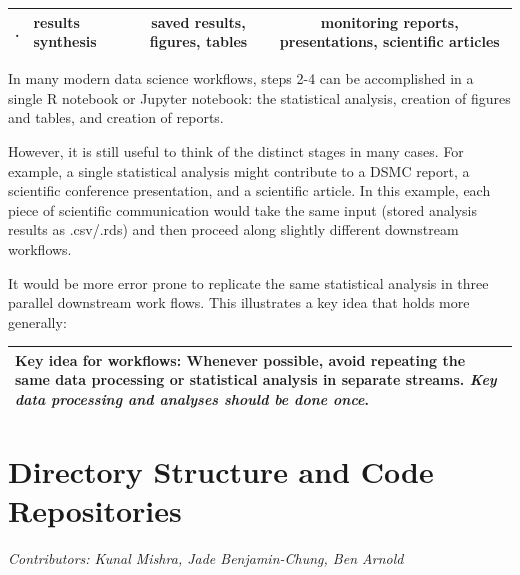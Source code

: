 \documentclass[]{book}
\begin{document}
\begin{longtable}[]{@{}clcc@{}}
\begin{minipage}[t]{0.07\columnwidth}
.\strut
\end{minipage} & \begin{minipage}[t]{0.25\columnwidth}\raggedright
results synthesis\strut
\end{minipage} & \begin{minipage}[t]{0.28\columnwidth}\centering
saved results, figures, tables\strut
\end{minipage} & \begin{minipage}[t]{0.29\columnwidth}\centering
monitoring reports, presentations, scientific articles\strut
\end{minipage}\tabularnewline
\bottomrule
\end{longtable}

In many modern data science workflows, steps 2-4 can be accomplished in a single R notebook or Jupyter notebook: the statistical analysis, creation of figures and tables, and creation of reports.

However, it is still useful to think of the distinct stages in many cases. For example, a single statistical analysis might contribute to a DSMC report, a scientific conference presentation, and a scientific article. In this example, each piece of scientific communication would take the same input (stored analysis results as .csv/.rds) and then proceed along slightly different downstream workflows.

It would be more error prone to replicate the same statistical analysis in three parallel downstream work flows. This illustrates a key idea that holds more generally:

\begin{longtable}[]{@{}l@{}}
\toprule
\endhead
\textbf{Key idea for workflows:} Whenever possible, avoid repeating the same data processing or statistical analysis in separate streams. \emph{Key data processing and analyses should be done once}.\tabularnewline
\bottomrule
\end{longtable}

\hypertarget{directory-structure-and-code-repositories}{%
\chapter{Directory Structure and Code Repositories}\label{directory-structure-and-code-repositories}}

\emph{Contributors: Kunal Mishra, Jade Benjamin-Chung, Ben Arnold}
\end{document}
